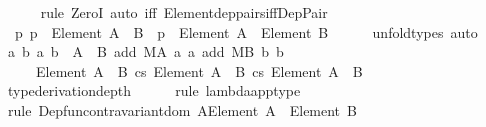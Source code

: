 \begin{isabellebody}
\ \ \ \ \isamarkupfalse%
\ {\isacharparenleft}{\kern0pt}rule\ ZeroI{\isacharparenright}{\kern0pt}\ {\isacharparenleft}{\kern0pt}auto\ iff{\isacharcolon}{\kern0pt}\ Element{\isacharunderscore}{\kern0pt}dep{\isacharunderscore}{\kern0pt}pairs{\isacharunderscore}{\kern0pt}iff{\isacharunderscore}{\kern0pt}Dep{\isacharunderscore}{\kern0pt}Pair{\isacharparenright}{\kern0pt}\isanewline
\ \ \isamarkupfalse%
\ {}{\isacharcolon}{\kern0pt}\ {\isachardoublequoteopen}{\isasymAnd}p{\isachardot}{\kern0pt}\ p\ {\isacharcolon}{\kern0pt}\ Element\ {\isacharparenleft}{\kern0pt}A\ {\isasymtimes}\ B{\isacharparenright}{\kern0pt}\ {\isasymlongleftrightarrow}\ p\ {\isacharcolon}{\kern0pt}\ Element\ A\ {\isasymtimes}\ Element\ B{\isachardoublequoteclose}\isanewline
\ \ \ \ \isamarkupfalse%
\ unfold{\isacharunderscore}{\kern0pt}types\ auto\isanewline
\ \ \isamarkupfalse%
\ {\isachardoublequoteopen}{\isasymlambda}{\isasymlangle}a{}{\isacharcomma}{\kern0pt}\ b{}{\isasymrangle}\ {\isasymlangle}a{}{\isacharcomma}{\kern0pt}\ b{}{\isasymrangle}\ {\isasymin}\ A\ {\isasymtimes}\ B{\isachardot}{\kern0pt}\ {\isasymlangle}add\ MA\ a{}\ a{}{\isacharcomma}{\kern0pt}\ add\ MB\ b{}\ b{}{\isasymrangle}\isanewline
\ \ \ \ {\isacharcolon}{\kern0pt}\ Element\ {\isacharparenleft}{\kern0pt}A\ {\isasymtimes}\ B{\isacharparenright}{\kern0pt}\ {\isasymrightarrow}cs\ Element\ {\isacharparenleft}{\kern0pt}A\ {\isasymtimes}\ B{\isacharparenright}{\kern0pt}\ {\isasymrightarrow}cs\ Element\ {\isacharparenleft}{\kern0pt}A\ {\isasymtimes}\ B{\isacharparenright}{\kern0pt}{\isachardoublequoteclose}\isanewline
\ \ \ \ \isamarkupfalse%
\ {\isacharbrackleft}{\kern0pt}{\isacharbrackleft}{\kern0pt}type{\isacharunderscore}{\kern0pt}derivation{\isacharunderscore}{\kern0pt}depth{\isacharequal}{\kern0pt}{}{\isacharbrackright}{\kern0pt}{\isacharbrackright}{\kern0pt}\isanewline
\ \ \ \ \isamarkupfalse%
\ {\isacharparenleft}{\kern0pt}rule\ lambda{\isacharunderscore}{\kern0pt}app{\isacharunderscore}{\kern0pt}type{\isacharparenright}{\kern0pt}\isanewline
\ \ \ \ \isamarkupfalse%
\ {\isacharparenleft}{\kern0pt}rule\ Dep{\isacharunderscore}{\kern0pt}fun{\isacharunderscore}{\kern0pt}contravariant{\isacharunderscore}{\kern0pt}dom{\isacharbrackleft}{\kern0pt}\ {\isacharquery}{\kern0pt}A{\isacharequal}{\kern0pt}{\isachardoublequoteopen}Element\ A\ {\isasymtimes}\ Element\ B{\isachardoublequoteclose}{\isacharbrackright}{\kern0pt}{\isacharparenright}{\kern0pt}\isanewline

\end{isabellebody}
